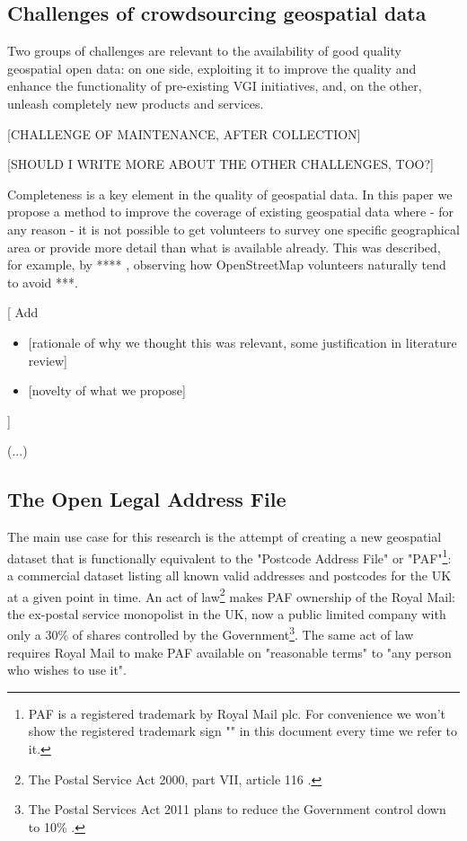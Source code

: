 \subsection{Challenges of crowdsourcing geospatial data}

    Two groups of challenges are relevant to the availability of good quality geospatial open data: on one side, exploiting it to improve the quality and enhance the functionality of pre-existing VGI initiatives, and, on the other, unleash completely new products and services.
    
    [CHALLENGE OF MAINTENANCE, AFTER COLLECTION]
    
    [SHOULD I WRITE MORE ABOUT THE OTHER CHALLENGES, TOO?]
    
    Completeness is a key element in the quality of geospatial data. In this paper we propose a method to improve the coverage of existing geospatial data where - for any reason - it is not possible to get volunteers to survey one specific geographical area or provide more detail than what is available already. This was described, for example, by **** , observing how OpenStreetMap volunteers naturally tend to avoid ***.
    
    {[}
    Add
    \begin{itemize}
    	\item {[}rationale of why we thought this was relevant, some justification in literature review{]}
    	\item {[}novelty of what we propose{]}
    \end{itemize}
    {]}
    
    {(}...{)}


\subsection{The Open Legal Address File}

    The main use case for this research is the attempt of creating a new geospatial dataset that is functionally equivalent to the "Postcode Address File" or "PAF"\footnote{PAF is a registered trademark by Royal Mail plc. For convenience we won't show the registered trademark sign "\textregistered" in this document every time we refer to it.}: a commercial dataset listing all known valid addresses and postcodes for the UK at a given point in time. 
    An act of law\footnote{The Postal Service Act 2000, part VII, article 116 \cite{postalserviceact2000}.} makes PAF ownership of the Royal Mail: the ex-postal service monopolist in the UK, now a public limited company with only a 30\% of shares controlled by the Government\footnote{The Postal Services Act 2011 plans to reduce the Government control down to 10\% \cite{postalserviceact2011}.}. The same act of law requires Royal Mail to make PAF available on "reasonable terms" to "any person who wishes to use it".
    
